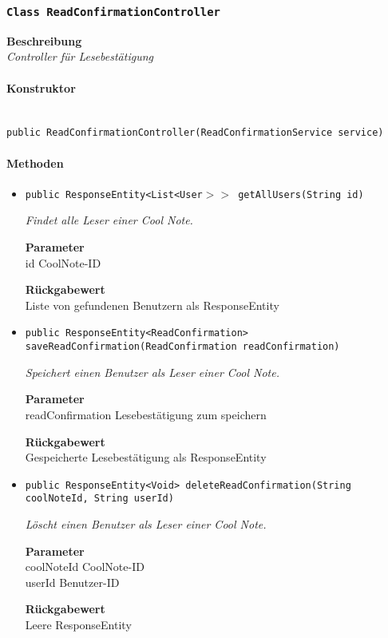     \subsubsection{\texttt{Class ReadConfirmationController}}
    \textbf{Beschreibung} \\
    \textit{Controller für Lesebestätigung}
    \paragraph*{Konstruktor}\mbox{} \\
    \texttt{public ReadConfirmationController(ReadConfirmationService service)} \\
    \paragraph*{Methoden}
    \begin{itemize}
    	\item{\texttt{public ResponseEntity<List<User$>>$ getAllUsers(String id)}}
    	
    	\textit{Findet alle Leser einer Cool Note.}
    	
    	\textbf{Parameter} \\
    	id CoolNote-ID
    	
    	\textbf{Rückgabewert} \\
    	Liste von gefundenen Benutzern als ResponseEntity        \item{\texttt{public ResponseEntity<ReadConfirmation> saveReadConfirmation(ReadConfirmation readConfirmation)}}
    	
    	\textit{Speichert einen Benutzer als Leser einer Cool Note.}
    	
    	\textbf{Parameter} \\
    	readConfirmation Lesebestätigung zum speichern
    	
    	\textbf{Rückgabewert} \\
    	Gespeicherte Lesebestätigung als ResponseEntity        \item{\texttt{public ResponseEntity<Void> deleteReadConfirmation(String coolNoteId, String userId)}}
    	
    	\textit{Löscht einen Benutzer als Leser einer Cool Note.}
    	
    	\textbf{Parameter} \\
    	coolNoteId CoolNote-ID\\
    	userId Benutzer-ID
    	
    	\textbf{Rückgabewert} \\
    	Leere ResponseEntity
    \end{itemize}
